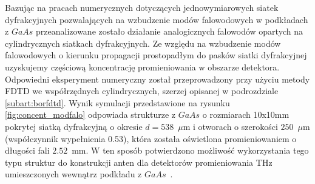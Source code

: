 Bazując na pracach numerycznych dotyczących  jednowymiarowych siatek dyfrakcyjnych pozwalających na wzbudzenie modów falowodowych w podkładach z $GaAs$ przeanalizowane zostało działanie analogicznych falowodów opartych na cylindrycznych siatkach dyfrakcyjnych. Ze względu na wzbudzenie modów falowodowych o kierunku propagacji prostopadłym do pasków siatki dyfrakcyjnej uzyskujemy częściową koncentrację promieniowania w obszarze detektora. Odpowiedni eksperyment numeryczny został przeprowadzony przy użyciu metody FDTD we współrzędnych cylindrycznych, szerzej opisanej w podrozdziale \ref{subart:borfdtd}. Wynik symulacji przedstawione na rysunku \ref{fig:concent_modfalo} odpowiada strukturze z $GaAs$ o rozmiarach 10x10mm pokrytej siatką dyfrakcyjną o okresie $d=538$~$\mu$m i otworach o szerokości $250$~$\mu$m (współczynnik wypełnienia 0.53), która została oświetlona promieniowaniem o długości fali $2.52$~mm. W ten sposób potwierdzono możliwość wykorzystania tego typu struktur do konstrukcji anten dla detektorów promieniowania THz umieszczonych wewnątrz podkładu z $GaAs$~\cite{Stolarek2011}.

